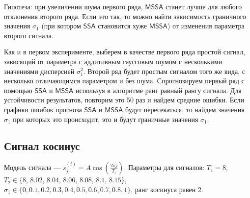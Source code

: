 \documentclass[specialist, substylefile = spbureport.rtx,
    subf,href,colorlinks=true, 12pt]{disser}
\newcommand{\SSA}{\mathsf{SSA}}
\newcommand{\MSSA}{\mathsf{MSSA}}
\begin{document}
        Гипотеза: при увеличении шума первого ряда, $\MSSA$ станет лучше для любого отклонения второго ряда. Если это так, то можно найти зависимость граничного значения $\sigma_1$ (при котором $\SSA$ становится хуже $\MSSA$) от изменения параметра второго сигнала.

        Как и в первом эксперименте, выберем в качестве первого ряда простой сигнал, зависящий от параметра с аддитивным гауссовым шумом с несколькими значениями дисперсией $\sigma_1^2$.
        Второй ряд будет простым сигналом того же вида, с несколько отличающимся параметром и без шума.
        Спрогнозируем первый ряд с помощью $\SSA$ и $\MSSA$ используя в алгоритме ранг равный рангу сигнала.
        Для устойчивости результатов, повторим это 50 раз и найдем средние ошибки.
        Если графики ошибок прогноза $\SSA$ и $\MSSA$ будут пересекаться, то найдем значения $\sigma_1$ при которых это происходит, это и будут граничные значения $\sigma_1$.

    \subsection{Сигнал косинус}
        Модель сигнала --- $s_j^{(i)} = A \cos(\frac{2\pi j}{T_i})$. Параметры для сигналов: $T_1 = 8$, $T_2 \in \{8$, $8.02$, $8.04$, $8.06$, $8.08$, $8.1$, $8.15\}$, $\sigma_1 \in \{0, 0.1, 0.2, 0.3, 0.4, 0.5, 0.6, 0.7, 0.8, 1\}$, ранг косинуса равен 2.
\end{document}

